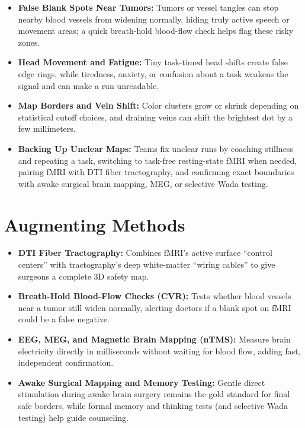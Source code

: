 \begin{itemize}
    \item \textbf{False Blank Spots Near Tumors:} Tumors or vessel tangles can stop nearby blood vessels from widening normally, hiding truly active speech or movement areas; a quick breath-hold blood-flow check helps flag these risky zones.
    \item \textbf{Head Movement and Fatigue:} Tiny task-timed head shifts create false edge rings, while tiredness, anxiety, or confusion about a task weakens the signal and can make a run unreadable.
    \item \textbf{Map Borders and Vein Shift:} Color clusters grow or shrink depending on statistical cutoff choices, and draining veins can shift the brightest dot by a few millimeters.
    \item \textbf{Backing Up Unclear Maps:} Teams fix unclear runs by coaching stillness and repeating a task, switching to task-free resting-state fMRI when needed, pairing fMRI with DTI fiber tractography, and confirming exact boundaries with awake surgical brain mapping, MEG, or selective Wada testing.
\end{itemize}

\section{Augmenting Methods}

\begin{itemize}
    \item \textbf{DTI Fiber Tractography:} Combines fMRI's active surface ``control centers'' with tractography's deep white-matter ``wiring cables'' to give surgeons a complete 3D safety map.
    \item \textbf{Breath-Hold Blood-Flow Checks (CVR):} Tests whether blood vessels near a tumor still widen normally, alerting doctors if a blank spot on fMRI could be a false negative.
    \item \textbf{EEG, MEG, and Magnetic Brain Mapping (nTMS):} Measure brain electricity directly in milliseconds without waiting for blood flow, adding fast, independent confirmation.
    \item \textbf{Awake Surgical Mapping and Memory Testing:} Gentle direct stimulation during awake brain surgery remains the gold standard for final safe borders, while formal memory and thinking tests (and selective Wada testing) help guide counseling.
\end{itemize}

